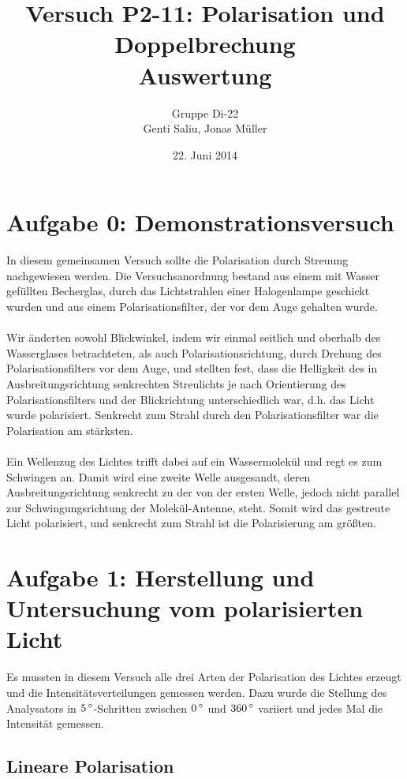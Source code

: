 \documentclass[a4paper,titlepage]{scrartcl}
\title{Versuch P2-11: Polarisation und Doppelbrechung\\Auswertung}
\author{Gruppe Di-22\\Genti Saliu, Jonas Müller}
\date{22. Juni 2014}
\numberwithin{equation}{section}
\begin{document}
\begin{titlepage}
\maketitle
\thispagestyle{empty}
\end{titlepage}

\newpage
{}
\tableofcontents

\newpage
{}

\section{Aufgabe 0: Demonstrationsversuch}
In diesem gemeinsamen Versuch sollte die Polarisation durch Streuung nachgewiesen werden. Die Versuchsanordnung bestand aus einem mit Wasser gefüllten Becherglas, durch das Lichtstrahlen einer Halogenlampe geschickt wurden und aus einem Polarisationsfilter, der vor dem Auge gehalten wurde.\\ \\
Wir änderten sowohl Blickwinkel, indem wir einmal seitlich und oberhalb des Wasserglases betrachteten, als auch Polarisationsrichtung, durch Drehung des Polarisationsfilters vor dem Auge, und stellten fest, dass die Helligkeit des in Ausbreitungsrichtung senkrechten Streulichts je nach Orientierung des Polarisationsfilters und der Blickrichtung unterschiedlich war, d.h. das Licht wurde polarisiert. Senkrecht zum Strahl durch den Polarisationsfilter war die Polarisation am stärksten.\\ \\
Ein Wellenzug des Lichtes trifft dabei auf ein Wassermolekül und regt es zum Schwingen an. Damit wird eine zweite Welle ausgesandt, deren Ausbreitungsrichtung senkrecht zu der von der ersten Welle, jedoch nicht parallel zur Schwingungsrichtung der Molekül-Antenne, steht. Somit wird das gestreute Licht polarisiert, und senkrecht zum Strahl ist die Polarisierung am größten.
\section{Aufgabe 1: Herstellung und Untersuchung vom polarisierten Licht}
Es mussten in diesem Versuch alle drei Arten der Polarisation des Lichtes erzeugt und die Intensitätsverteilungen gemessen werden. Dazu wurde die Stellung des Analysators in $\unit[5]{^\circ}$-Schritten zwischen $\unit[0]{^\circ}$ und $\unit[360]{^\circ}$ variiert und jedes Mal die Intensität gemessen.
\subsection{Lineare Polarisation}
\end{document}
